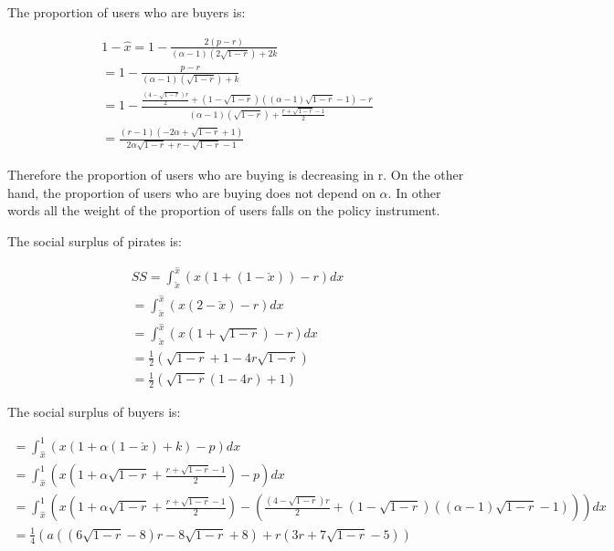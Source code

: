 \documentclass{article}
\begin{document}
The proportion of users who are buyers is: 

\begin{align*}
1-\hat{x}=1-\frac{2(p-r)}{(\alpha-1)(2\sqrt{1-r})+2k} \\
=1-\frac{p-r}{(\alpha-1)(\sqrt{1-r})+k} \\
=1-\frac{\frac{(4-\sqrt{1-r})r}{2}
+(1-\sqrt{1-r})((\alpha-1) \sqrt{1-r}-1) -r}{(\alpha-1)(\sqrt{1-r})+\frac{r+\sqrt{1-r}-1}{2}} \\
=\frac{(r-1) \left(-2
   \alpha+\sqrt{1-r}+1\right)}{2 \alpha   \sqrt{1-r}+r-\sqrt{1-r}-1}
\end{align*}

Therefore the proportion of users who are buying is decreasing in r. On the other hand, the proportion of users who are buying does not depend on $\alpha$. In other words all the weight of the proportion of users falls on the policy instrument.

The social surplus of pirates is:

\begin{align*}
SS=\int_{\check{x}}^{\hat{x}}(x(1+(1-\check{x}))-r)dx \\
=\int_{\check{x}}^{\hat{x}}(x(2-\check{x})-r)dx \\
=\int_{\check{x}}^{\hat{x}}(x(1+\sqrt{1-r})-r)dx \\
=\frac{1}{2} \left(\sqrt{1-r}+1-4r \sqrt{1-r} \right)\\
=\frac{1}{2} \left(\sqrt{1-r}(1-4r)+1 \right)
\end{align*}



The social surplus of buyers is:

\begin{align*}
=\int_{\hat{x}}^{1}(x(1+\alpha(1-\check{x})+k)-p)dx \\
=\int_{\hat{x}}^{1}(x(1+\alpha\sqrt{1-r}+\frac{r+\sqrt{1-r}-1}{2})-p)dx 
\\
=\int_{\hat{x}}^{1}(x(1+\alpha\sqrt{1-r}+\frac{r+\sqrt{1-r}-1}{2})-
\left(
\frac{(4-\sqrt{1-r})r}{2}
+(1-\sqrt{1-r})((\alpha-1) \sqrt{1-r}-1) 
\right))dx 
\\
=\frac{1}{4} \left(a \left(\left(6 \sqrt{1-r}-8\right) r-8
   \sqrt{1-r}+8\right)+r \left(3 r+7
   \sqrt{1-r}-5\right)\right)
\end{align*}
\end{document}

